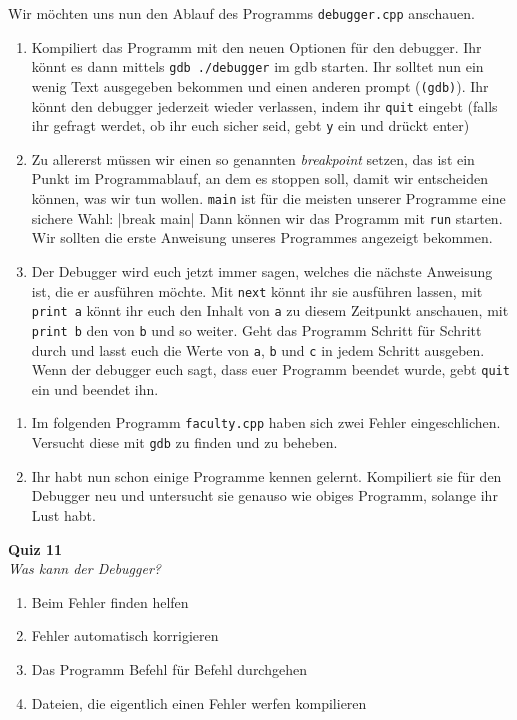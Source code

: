 \newpage

\begin{praxis}

    Wir möchten uns nun den Ablauf des Programms \texttt{debugger.cpp} anschauen.

    \begin{enumerate}
        \item Kompiliert das Programm mit den neuen Optionen für den debugger. Ihr
              könnt es dann mittels \verb|gdb ./debugger| im gdb starten. Ihr solltet
              nun ein wenig Text ausgegeben bekommen und einen anderen prompt
              (\texttt{(gdb)}). Ihr könnt den debugger jederzeit wieder verlassen,
              indem ihr \texttt{quit} eingebt (falls ihr gefragt werdet, ob ihr euch
              sicher seid, gebt \texttt{y} ein und drückt enter)
        \item Zu allererst müssen wir einen so genannten \emph{breakpoint} setzen,
              das ist ein Punkt im Programmablauf, an dem es stoppen soll, damit wir
              entscheiden können, was wir tun wollen. \texttt{main} ist für die
              meisten unserer Programme eine sichere Wahl:
              |break main|
              Dann können wir das Programm mit \texttt{run} starten. Wir sollten die
              erste Anweisung unseres Programmes angezeigt bekommen.
        \item Der Debugger wird euch jetzt immer sagen, welches die nächste
              Anweisung ist, die er ausführen möchte. Mit \texttt{next} könnt ihr sie
              ausführen lassen, mit \texttt{print a} könnt ihr euch den Inhalt von
              \texttt{a} zu diesem Zeitpunkt anschauen, mit \texttt{print b} den von
              \texttt{b} und so weiter. Geht das Programm Schritt für Schritt durch
              und lasst euch die Werte von \texttt{a}, \texttt{b} und \texttt{c} in
              jedem Schritt ausgeben. Wenn der debugger euch sagt, dass euer Programm
              beendet wurde, gebt \texttt{quit} ein und beendet ihn.
    \end{enumerate}
\end{praxis}

\begin{spiel}
\begin{enumerate}
        \item Im folgenden Programm \texttt{faculty.cpp} haben sich zwei Fehler eingeschlichen. Versucht diese mit \texttt{gdb} zu finden und zu beheben.
        
        
        \item Ihr habt nun schon einige Programme kennen gelernt. Kompiliert sie
              für den Debugger neu und untersucht sie genauso wie obiges Programm,
              solange ihr Lust habt.
\end{enumerate}
\end{spiel}

\textbf{Quiz 11}\\
\textit{Was kann der Debugger?}
\begin{enumerate}[label=\alph*)]
    \item Beim Fehler finden helfen
    \item Fehler automatisch korrigieren
    \item Das Programm Befehl für Befehl durchgehen
    \item Dateien, die eigentlich einen Fehler werfen kompilieren
\end{enumerate}
